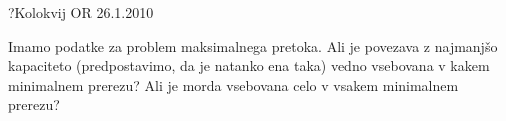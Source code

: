 \begin{naloga}{?}{Kolokvij OR 26.1.2010}
\begin{vprasanje}
Imamo podatke za problem maksimalnega pretoka.
Ali je povezava z najmanjšo kapaciteto
(predpostavimo, da je natanko ena taka)
vedno vsebovana v kakem minimalnem prerezu?
Ali je morda vsebovana celo v vsakem minimalnem prerezu?
\end{vprasanje}
\begin{odgovor}
\end{odgovor}
\end{naloga}

